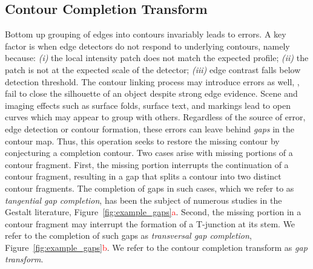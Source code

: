 \subsection{Contour Completion Transform}

Bottom up grouping of edges into contours invariably leads to errors. A key factor is when edge detectors do not respond to underlying contours, namely because: \emph{(i)} the local intensity patch does not match the expected profile; \emph{(ii)} the patch is not at the expected scale of the detector; \emph{(iii)} edge contrast falls below detection threshold. The contour linking process may introduce errors as well, \eg, fail to close the silhouette of an object despite strong edge evidence. Scene and imaging effects such as surface folds, surface text, and markings lead to open curves which may appear to group with others. Regardless of the source of error, edge detection or contour formation, these errors can leave behind \emph{gaps} in the contour map. Thus, this operation seeks to restore the missing contour by conjecturing a completion contour. Two cases arise with missing portions of a contour fragment. First, the missing portion interrupts the continuation of a contour fragment, resulting in a gap that splits a contour into two distinct contour fragments. The completion of gaps in such cases, which we refer to as \emph{tangential gap completion}, has been the subject of numerous studies in the Gestalt literature, Figure~\ref{fig:example_gaps}\textcolor{red}{a}. Second, the missing portion in a contour fragment may interrupt the formation of a T-junction at its stem. We refer to the completion of such gaps as \emph{transversal gap completion}, Figure~\ref{fig:example_gaps}\textcolor{red}{b}. We refer to the contour completion transform as \emph{gap transform}. 


